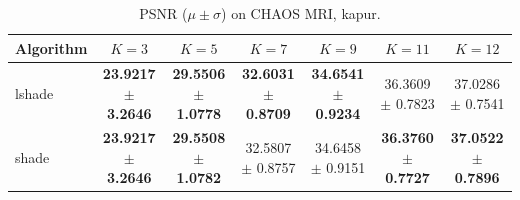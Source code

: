 \begin{table}[htbp]
\centering
\caption{PSNR ($\mu \pm \sigma$) on CHAOS MRI, kapur.}
\label{tab:exp2-kapur-psnr}
\begin{tabular}{lcccccc}
\toprule
Algorithm & $K=3$ & $K=5$ & $K=7$ & $K=9$ & $K=11$ & $K=12$ \\
\midrule
lshade & \textbf{23.9217 $\pm$ 3.2646} & \textbf{29.5506 $\pm$ 1.0778} & \textbf{32.6031 $\pm$ 0.8709} & \textbf{34.6541 $\pm$ 0.9234} & 36.3609 $\pm$ 0.7823 & 37.0286 $\pm$ 0.7541 \\
shade & \textbf{23.9217 $\pm$ 3.2646} & \textbf{29.5508 $\pm$ 1.0782} & 32.5807 $\pm$ 0.8757 & 34.6458 $\pm$ 0.9151 & \textbf{36.3760 $\pm$ 0.7727} & \textbf{37.0522 $\pm$ 0.7896} \\
\bottomrule
\end{tabular}
\end{table}